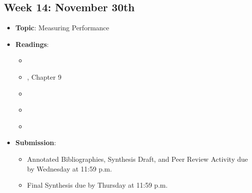 \documentclass[12pt, letterpaper]{article}
\begin{document}
\subsection*{Week 14: November 30th}
    \begin{itemize}
        \item \textbf{Topic}: Measuring Performance
        \item \textbf{Readings}:
            \begin{itemize}
                \item \cite{Behn2003}
                \item \cite{Denhardt2015}, Chapter 9
                \item \cite{Douglas2021}
                \item \cite{Marvel2016}
                \item \cite{NicholsonCrotty2004}
            \end{itemize}
        \item \textbf{Submission}: 
                \begin{itemize}
                    \item Annotated Bibliographies, Synthesis Draft, and Peer Review Activity due by Wednesday at 11:59 p.m. 
                    \item Final Synthesis due by Thursday at 11:59 p.m.
                \end{itemize}
    \end{itemize}
\end{document}

